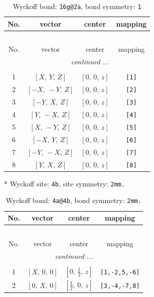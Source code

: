 \documentclass[fleqn,8pt]{jsarticle}
\begin{document}
\renewcommand{\arraystretch}{1.2}
\begin{longtable}{cccc}
\caption{Wyckoff bond: {\tt 16g@2a}, bond symmetry: {\tt 1}}
 \\
 \hline \hline
No. & vector & center & mapping \\ \hline \endfirsthead

\multicolumn{3}{l}{\tablename\ \thetable{}} \\
 \hline \hline
No. & vector & center & mapping \\ \hline \endhead

 \hline \hline
\multicolumn{3}{r}{\footnotesize\it continued ...} \\ \endfoot

 \hline \hline
\multicolumn{3}{r}{} \\ \endlastfoot

1 & $\left[ X,\, Y,\, Z \right]$ & $\left[ 0,\, 0,\, z \right]$ & {\tt [1]} \\ \hline
2 & $\left[ - X,\, - Y,\, Z \right]$ & $\left[ 0,\, 0,\, z \right]$ & {\tt [2]} \\ \hline
3 & $\left[ - Y,\, X,\, Z \right]$ & $\left[ 0,\, 0,\, z \right]$ & {\tt [3]} \\ \hline
4 & $\left[ Y,\, - X,\, Z \right]$ & $\left[ 0,\, 0,\, z \right]$ & {\tt [4]} \\ \hline
5 & $\left[ X,\, - Y,\, Z \right]$ & $\left[ 0,\, 0,\, z \right]$ & {\tt [5]} \\ \hline
6 & $\left[ - X,\, Y,\, Z \right]$ & $\left[ 0,\, 0,\, z \right]$ & {\tt [6]} \\ \hline
7 & $\left[ - Y,\, - X,\, Z \right]$ & $\left[ 0,\, 0,\, z \right]$ & {\tt [7]} \\ \hline
8 & $\left[ Y,\, X,\, Z \right]$ & $\left[ 0,\, 0,\, z \right]$ & {\tt [8]} \\
\end{longtable}
* Wyckoff site: {\tt 4b}, site symmetry: {\tt 2mm.}
\renewcommand{\arraystretch}{1.2}
\begin{longtable}{cccc}
\caption{Wyckoff bond: {\tt 4a@4b}, bond symmetry: {\tt 2mm.}}
 \\
 \hline \hline
No. & vector & center & mapping \\ \hline \endfirsthead

\multicolumn{3}{l}{\tablename\ \thetable{}} \\
 \hline \hline
No. & vector & center & mapping \\ \hline \endhead

 \hline \hline
\multicolumn{3}{r}{\footnotesize\it continued ...} \\ \endfoot

 \hline \hline
\multicolumn{3}{r}{} \\ \endlastfoot

1 & $\left[ X,\, 0,\, 0 \right]$ & $\left[ 0,\, \frac{1}{2},\, z \right]$ & {\tt [1,-2,5,-6]} \\ \hline
2 & $\left[ 0,\, X,\, 0 \right]$ & $\left[ \frac{1}{2},\, 0,\, z \right]$ & {\tt [3,-4,-7,8]} \\
\end{longtable}
\end{document}
